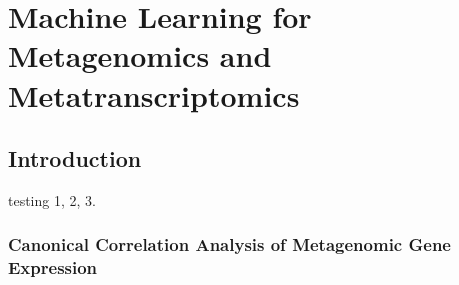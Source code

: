 \chapter{Machine Learning for Metagenomics and Metatranscriptomics}
\label{chapter:C}

\section{Introduction}
testing 1, 2, 3.

\subsection{Canonical Correlation Analysis of Metagenomic Gene Expression}


